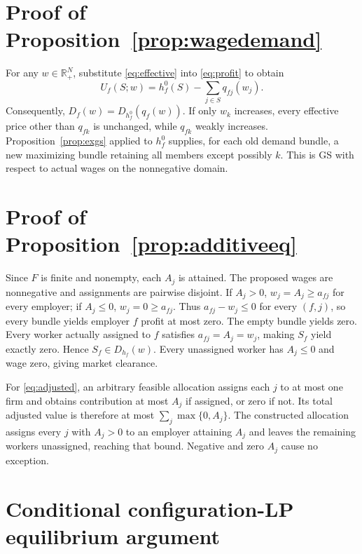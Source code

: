 \documentclass[11pt]{article}
\theoremstyle{definition}
\theoremstyle{remark}
\numberwithin{equation}{section}
\begin{document}
\section{Proof of Proposition~\ref{prop:wagedemand}}\label{app:wagedemand}

For any $w\in\mathbb R_+^N$, substitute \eqref{eq:effective} into \eqref{eq:profit} to obtain
\[
U_f(S;w)=h_f^0(S)-\sum_{j\in S}q_{fj}(w_j).
\]
Consequently, $D_f(w)=D_{h_f^0}(q_f(w))$. If only $w_k$ increases, every effective price other than $q_{fk}$ is unchanged, while $q_{fk}$ weakly increases. Proposition~\ref{prop:exgs} applied to $h_f^0$ supplies, for each old demand bundle, a new maximizing bundle retaining all members except possibly $k$. This is GS with respect to actual wages on the nonnegative domain.

\section{Proof of Proposition~\ref{prop:additiveeq}}\label{app:additiveeq}

Since $F$ is finite and nonempty, each $A_j$ is attained. The proposed wages are nonnegative and assignments are pairwise disjoint. If $A_j>0$, $w_j=A_j\ge a_{fj}$ for every employer; if $A_j\le0$, $w_j=0\ge a_{fj}$. Thus $a_{fj}-w_j\le0$ for every $(f,j)$, so every bundle yields employer $f$ profit at most zero. The empty bundle yields zero. Every worker actually assigned to $f$ satisfies $a_{fj}=A_j=w_j$, making $S_f$ yield exactly zero. Hence $S_f\in D_{h_f}(w)$. Every unassigned worker has $A_j\le0$ and wage zero, giving market clearance.

For \eqref{eq:adjusted}, an arbitrary feasible allocation assigns each $j$ to at most one firm and obtains contribution at most $A_j$ if assigned, or zero if not. Its total adjusted value is therefore at most $\sum_j\max\{0,A_j\}$. The constructed allocation assigns every $j$ with $A_j>0$ to an employer attaining $A_j$ and leaves the remaining workers unassigned, reaching that bound. Negative and zero $A_j$ cause no exception.

\section{Conditional configuration-LP equilibrium argument}\label{app:lp}
\end{document}
